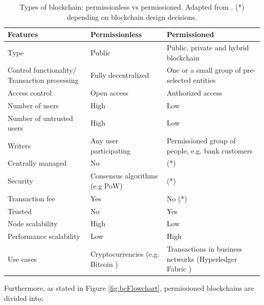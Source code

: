 \begin{table}[bth]
	\myfloatalign \footnotesize
	\begin{tabularx}{\textwidth}{>{\raggedright\arraybackslash}p{4cm} >{\raggedright\arraybackslash}p{6cm}>{\raggedright\arraybackslash}p{6cm}}
	\textbf{Features} & \textbf{Permissionless} & \textbf{Permissioned}\\ 
		\hline
		Type & Public & Public, private and hybrid blockchain \\
		Control functionality/ Transaction processing & Fully decentralized & One or a small group of pre-selected entities \\
		Access control & Open access & Authorized access \\ 
		Number of users & High & Low \\
		Number of untrusted users & High & Low \\
		Writers & Any user participating & Permissioned group of people, e.g. bank customers\\
		Centrally managed & No & (*) \\
		Security & Consensus algorithms (e.g PoW) & (*) \\
		Transaction fee & Yes & No (*) \\
		Trusted & No & Yes \\
		Node scalability & High & Low \\
		Performance scalability & Low & High \\
		Use cases & Cryptocurrencies (e.g. Bitcoin \citep{bitcoin}) & Transactions in business networks (Hyperledger Fabric \citep{hyperledger}) \\ \hline
	\end{tabularx}
		\caption{Types of blockchain: permissionless vs permissioned. Adapted from \citep{wust2017you}. (*) depending on blockchain design decisions.}
	\label{tab:blockchainTypes}
\end{table}

Furthermore, as stated in Figure \ref{fig:bcFlowchart}, permissioned blockchains are divided into:

